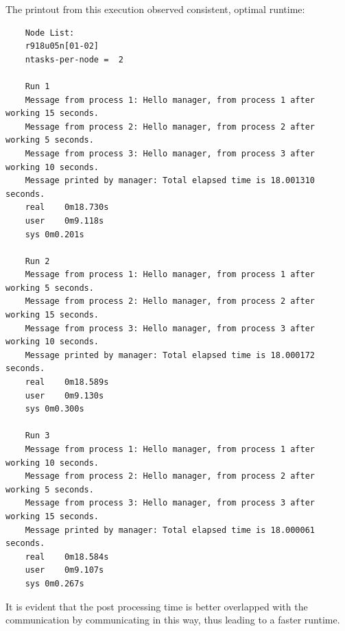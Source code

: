 \documentclass{article}
\begin{document}
The printout from this execution observed consistent, optimal runtime:
\begin{verbatim}
    Node List:
    r918u05n[01-02]
    ntasks-per-node =  2
    
    Run 1
    Message from process 1: Hello manager, from process 1 after working 15 seconds.
    Message from process 2: Hello manager, from process 2 after working 5 seconds.
    Message from process 3: Hello manager, from process 3 after working 10 seconds.
    Message printed by manager: Total elapsed time is 18.001310 seconds.
    real	0m18.730s
    user	0m9.118s
    sys	0m0.201s
    
    Run 2
    Message from process 1: Hello manager, from process 1 after working 5 seconds.
    Message from process 2: Hello manager, from process 2 after working 15 seconds.
    Message from process 3: Hello manager, from process 3 after working 10 seconds.
    Message printed by manager: Total elapsed time is 18.000172 seconds.
    real	0m18.589s
    user	0m9.130s
    sys	0m0.300s
    
    Run 3
    Message from process 1: Hello manager, from process 1 after working 10 seconds.
    Message from process 2: Hello manager, from process 2 after working 5 seconds.
    Message from process 3: Hello manager, from process 3 after working 15 seconds.
    Message printed by manager: Total elapsed time is 18.000061 seconds.
    real	0m18.584s
    user	0m9.107s
    sys	0m0.267s
\end{verbatim}
It is evident that the post processing time is better overlapped with the communication by communicating 
in this way, thus leading to a faster runtime.
\end{document}
